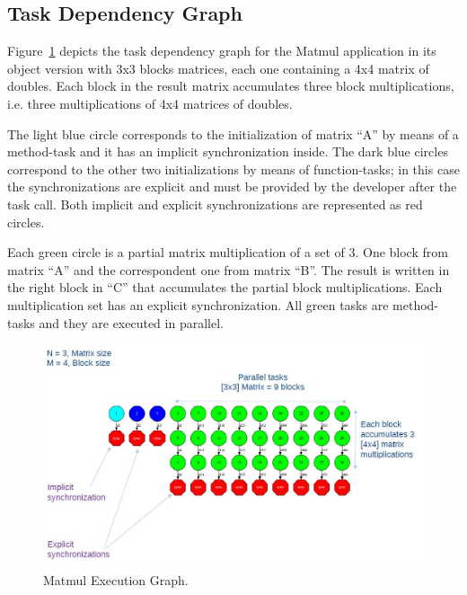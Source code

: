 \subsection{Task Dependency Graph}
Figure~\ref{fig:matmul_exec_graph} depicts the task dependency graph for the Matmul application in its object version with 3x3 blocks matrices, each one containing a 4x4 matrix of doubles.
Each block in the result matrix accumulates three block multiplications, i.e. three multiplications of 4x4 matrices of doubles.

The light blue circle corresponds to the initialization of matrix ``A'' by means of a method-task and it has 
an implicit synchronization inside. The dark blue circles correspond to the other two initializations by 
means of function-tasks; in this case the synchronizations are explicit and must be provided by the developer after the 
task call. Both implicit and explicit synchronizations are represented as red circles.

Each green circle is a partial matrix multiplication of a set of 3. One block from matrix ``A'' and the 
correspondent one from matrix ``B''. The result is written in the right block in ``C'' that accumulates 
the partial block multiplications. Each multiplication set has an explicit synchronization. 
All green tasks are method-tasks and they are executed in parallel.

\begin{figure}[ht!]
  \centering
    \includegraphics[width=1.0\textwidth]{./Sections/4_C/Figures/matmul.jpeg}
    \caption{Matmul Execution Graph.}
    \label{fig:matmul_exec_graph}
\end{figure}
